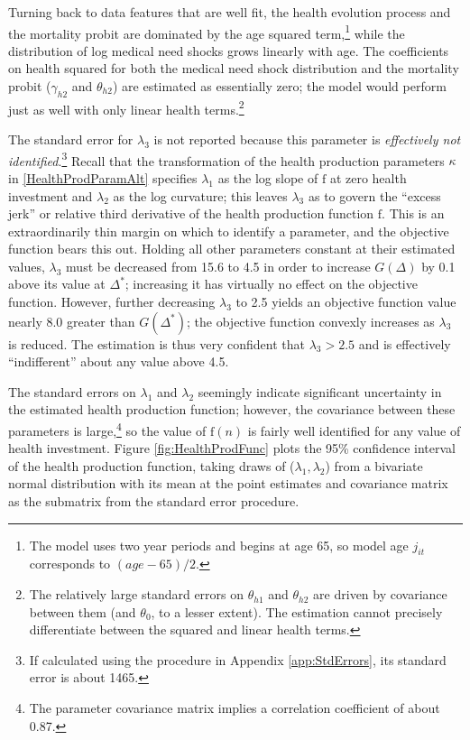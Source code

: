 \documentclass[12pt,pdftex,letterpaper]{article}
\newcommand{\Health}{h}
\newcommand{\Invst}{n}
\newcommand{\MedShkParam}{\gamma}
\newcommand{\Age}{j}
\newcommand{\MortParam}{\theta}
\newcommand{\HealthProdFunc}{\text{f}}
\newcommand{\HealthProdParam}{\kappa}
\newcommand{\HealthProdParamAlt}{\lambda}
\begin{document}
Turning back to data features that are well fit, the health evolution process and the mortality probit are dominated by the age squared term,\footnote{The model uses two year periods and begins at age 65, so model age $\Age_{it}$ corresponds to $(age - 65)/2$.} while the distribution of log medical need shocks grows linearly with age.  The coefficients on health squared for both the medical need shock distribution and the mortality probit ($\MedShkParam_{\Health 2}$ and $\MortParam_{\Health 2}$) are estimated as essentially zero; the model would perform just as well with only linear health terms.\footnote{The relatively large standard errors on $\MortParam_{\Health 1}$ and $\MortParam_{\Health 2}$ are driven by covariance between them (and $\MortParam_0$, to a lesser extent).  The estimation cannot precisely differentiate between the squared and linear health terms.}

The standard error for $\HealthProdParamAlt_3$ is not reported because this parameter is \textit{effectively not identified}.\footnote{If calculated using the procedure in Appendix \ref{app:StdErrors}, its standard error is about 1465.}  Recall that the transformation of the health production parameters $\HealthProdParam$ in \eqref{HealthProdParamAlt} specifies $\HealthProdParamAlt_1$ as the log slope of $\HealthProdFunc$ at zero health investment and $\HealthProdParamAlt_2$ as the log curvature; this leaves $\HealthProdParamAlt_3$ as to govern the ``excess jerk'' or relative third derivative of the health production function $\HealthProdFunc$.  This is an extraordinarily thin margin on which to identify a parameter, and the objective function bears this out. Holding all other parameters constant at their estimated values, $\HealthProdParamAlt_3$ must be decreased from 15.6 to 4.5 in order to increase $G(\Delta)$ by 0.1 above its value at $\Delta^*$; increasing it has virtually no effect on the objective function.  However, further decreasing $\HealthProdParamAlt_3$  to 2.5 yields an objective function value nearly 8.0 greater than $G(\Delta^*)$; the objective function convexly increases as $\HealthProdParamAlt_3$ is reduced.  The estimation is thus very confident that $\HealthProdParamAlt_3 > 2.5$ and is effectively ``indifferent'' about any value above 4.5.

The standard errors on $\HealthProdParamAlt_1$ and $\HealthProdParamAlt_2$ seemingly indicate significant uncertainty in the estimated health production function; however, the covariance between these parameters is large,\footnote{The parameter covariance matrix implies a correlation coefficient of about 0.87.} so the value of $\HealthProdFunc(\Invst)$ is fairly well identified for any value of health investment.  Figure \ref{fig:HealthProdFunc} plots the 95\% confidence interval of the health production function, taking draws of ($\HealthProdParamAlt_1,\HealthProdParamAlt_2$) from a bivariate normal distribution with its mean at the point estimates and covariance matrix as the submatrix from the standard error procedure.
\end{document}
